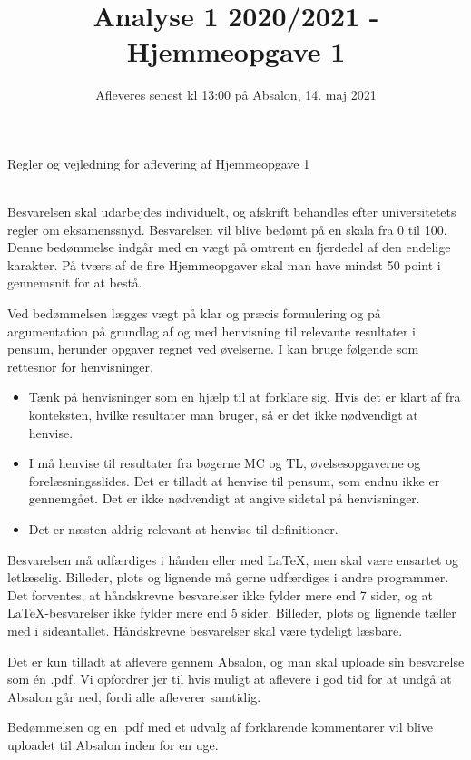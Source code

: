 \documentclass{article}
\title{Analyse 1 2020/2021 - Hjemmeopgave 1}
\author{}
\date{\vspace{-1cm}Afleveres senest kl 13:00 på Absalon, 14. maj 2021}
\begin{document}
	
	\maketitle
	
	\noindent
	
	
	
	
	\newpage
	\noindent
	{\LARGE Regler og vejledning for aflevering af Hjemmeopgave 1}
	
	\noindent\hrulefill \\
	
	\noindent
	Besvarelsen skal udarbejdes individuelt, og afskrift behandles efter universitetets regler om eksamenssnyd. Besvarelsen vil blive bedømt på en skala fra 0 til 100. Denne bedømmelse indgår med en vægt på omtrent en fjerdedel af den endelige karakter. På tværs af de fire Hjemmeopgaver skal man have mindst 50 point i gennemsnit for at bestå.
	
	Ved bedømmelsen lægges vægt på klar og præcis formulering og på argumentation på grundlag af og med henvisning til relevante resultater i pensum, herunder opgaver regnet ved øvelserne. I kan bruge følgende som rettesnor for henvisninger.
	\begin{itemize}
		\item Tænk på henvisninger som en hjælp til at forklare sig. Hvis det er klart af fra konteksten, hvilke resultater man bruger, så er det ikke nødvendigt at henvise.
		
		\item I må henvise til resultater fra bøgerne MC og TL, øvelsesopgaverne og forelæsningsslides. Det er tilladt at henvise til pensum, som endnu ikke er gennemgået. Det er ikke nødvendigt at angive sidetal på henvisninger. 
		
		\item Det er næsten aldrig relevant at henvise til definitioner.
	\end{itemize}
	
	\bigskip  
	\noindent
	Besvarelsen må udfærdiges i hånden eller med \LaTeX, men skal være ensartet og letlæselig. Billeder, plots og lignende må gerne udfærdiges i andre programmer. Det forventes, at håndskrevne besvarelser ikke fylder mere end 7 sider,
	og at \LaTeX-besvarelser ikke fylder mere end 5 sider. Billeder, plots og lignende tæller med i sideantallet. Håndskrevne besvarelser skal være tydeligt læsbare.
	
	\bigskip 
	\noindent
	Det er kun tilladt at aflevere gennem Absalon, og man skal uploade sin besvarelse som én .pdf. Vi opfordrer jer til hvis muligt at aflevere i god tid for at undgå at Absalon går ned, fordi alle afleverer samtidig.
	
	\bigskip
	\noindent
	Bedømmelsen og en .pdf med et udvalg af forklarende kommentarer vil blive uploadet til Absalon inden for en uge.
\end{document}
